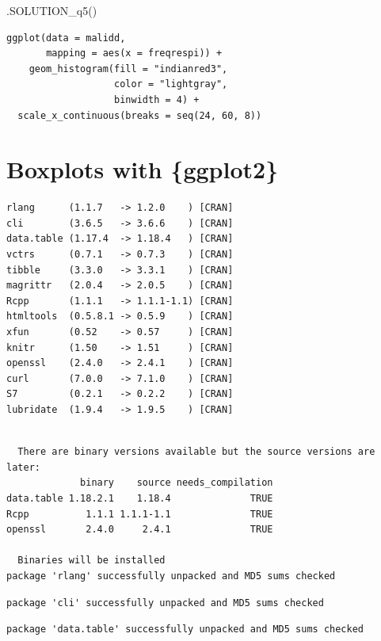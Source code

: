 \documentclass[
  letterpaper,
  DIV=11,
  numbers=noendperiod]{scrreprt}
\newenvironment{Shaded}{\begin{snugshade}}{\end{snugshade}}
\newcommand{\FunctionTok}[1]{\textcolor[rgb]{0.28,0.35,0.67}{#1}}
\newcommand{\NormalTok}[1]{\textcolor[rgb]{0.00,0.23,0.31}{#1}}
\begin{document}
\begin{Shaded}
\begin{Highlighting}[]
\FunctionTok{.SOLUTION\_q5}\NormalTok{()}
\end{Highlighting}
\end{Shaded}

\begin{verbatim}
ggplot(data = malidd, 
       mapping = aes(x = freqrespi)) +
    geom_histogram(fill = "indianred3",
                   color = "lightgray", 
                   binwidth = 4) +
  scale_x_continuous(breaks = seq(24, 60, 8))
\end{verbatim}

\chapter{Boxplots with \{ggplot2\}}\label{boxplots-with-ggplot2}

\begin{verbatim}
rlang      (1.1.7   -> 1.2.0    ) [CRAN]
cli        (3.6.5   -> 3.6.6    ) [CRAN]
data.table (1.17.4  -> 1.18.4   ) [CRAN]
vctrs      (0.7.1   -> 0.7.3    ) [CRAN]
tibble     (3.3.0   -> 3.3.1    ) [CRAN]
magrittr   (2.0.4   -> 2.0.5    ) [CRAN]
Rcpp       (1.1.1   -> 1.1.1-1.1) [CRAN]
htmltools  (0.5.8.1 -> 0.5.9    ) [CRAN]
xfun       (0.52    -> 0.57     ) [CRAN]
knitr      (1.50    -> 1.51     ) [CRAN]
openssl    (2.4.0   -> 2.4.1    ) [CRAN]
curl       (7.0.0   -> 7.1.0    ) [CRAN]
S7         (0.2.1   -> 0.2.2    ) [CRAN]
lubridate  (1.9.4   -> 1.9.5    ) [CRAN]
\end{verbatim}

\begin{verbatim}

  There are binary versions available but the source versions are later:
             binary    source needs_compilation
data.table 1.18.2.1    1.18.4              TRUE
Rcpp          1.1.1 1.1.1-1.1              TRUE
openssl       2.4.0     2.4.1              TRUE

  Binaries will be installed
package 'rlang' successfully unpacked and MD5 sums checked
\end{verbatim}

\begin{verbatim}
package 'cli' successfully unpacked and MD5 sums checked
\end{verbatim}

\begin{verbatim}
package 'data.table' successfully unpacked and MD5 sums checked
\end{verbatim}
\end{document}
